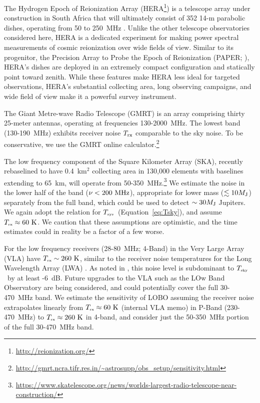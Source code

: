 \documentclass[iop,numberedappendix,apj]{emulateapj}
\newcommand{\Tsky}{\mbox{$T_{\mbox{\tiny sky}}$}}
\newcommand{\Tsys}{\mbox{$T_{\mbox{\tiny sys}}$}}
\newcommand{\Trx}{\mbox{$T_{\mbox{\tiny rx}}$}}
\begin{document}
The Hydrogen Epoch of Reionization Array (HERA\footnote{\url{http://reionization.org/}}) is a telescope array under construction
in South Africa that will ultimately consist of 352 14-m parabolic dishes, operating from 50 to 250~MHz \citep{pober_et_al2014}.
Unlike the other telescope observatories considered here, HERA is a dedicated experiment for making power spectral measurements 
of cosmic reionization over wide fields of view.  Similar to its progenitor, the Precision Array to Probe the Epoch of Reionization
(PAPER; \citealt{parsons_et_al2010}), HERA's dishes are deployed in an extremely compact configuration \citep{parsons_et_al2012} and 
statically point toward zenith.  While these features make HERA less ideal for targeted observations, HERA's substantial collecting area,
long observing campaigns, and wide field of view make it a powerful survey instrument.

The Giant Metre-wave Radio Telescope (GMRT) is an array comprising thirty 25-meter antennas, operating at frequencies 130-2000~MHz.
The lowest band (130-190~MHz) exhibits receiver noise $T_{\rm rx}$ comparable to the sky noise.
To be conservative, we use the GMRT online calculator.\footnote{\url{http://gmrt.ncra.tifr.res.in/~astrosupp/obs\_setup/sensitivity.html}}


The low frequency component of the Square Kilometer Array (SKA), recently rebaselined to have 0.4~km$^2$ collecting area in 130,000 elements with baselines extending to 65~km, will operate from 50-350~MHz.\footnote{\url{https://www.skatelescope.org/news/worlds-largest-radio-telescope-near-construction/}}
We estimate the noise in the lower half of the band ($\nu<200~\rm MHz$), appropriate for lower mass ($\lesssim 10 M_{\rm J}$) separately from the full band, which could be used to detect $\sim 30 M_{\rm J}$ Jupiters.
We again adopt the \cite{Rogers+Bowman2008} relation for \Tsys\ (Equation~\ref{eq:Tsky}), and assume $\Trx \approx 60~\rm K$.
We caution that these assumptions are optimistic, and the time estimates could in reality be a factor of a few worse.

For the low frequency receivers (28-80~MHz; 4-Band) in the Very Large Array (VLA) have $\Trx \sim 260~\rm K$, similar to the receiver noise temperatures for the Long Wavelength Array (LWA) \citep{Hicks2012}.  As noted in \citep{Hicks2012}, this noise level is subdominant to \Tsky\ by at least -6~dB.
Future upgrades to the VLA such as the LOw Band Observatory \citep[LOBO][]{Kassim2015IAU} are being considered, and could potentially cover the full 30-470~MHz band.
We estimate the sensitivity of LOBO assuming the receiver noise extrapolates linearly from $\Trx \approx 60~\rm K$ (internal VLA memo) in P-Band (230-470~MHz) to $\Trx \approx 260~\rm K$ in 4-band, and consider just the 50-350~MHz portion of the full 30-470~MHz band.
\end{document}
